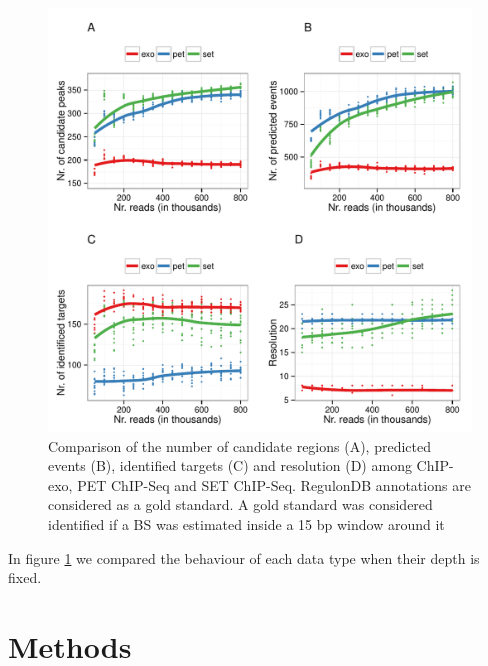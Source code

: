 \documentclass{bmcart}\usepackage[]{graphicx}\usepackage[]{color}
\begin{document}
\begin{figure}[h!]
  \centering
  \includegraphics[width = .8\textwidth]{../figs/for_paper/Sig70_aerobic_saturation.pdf}
  \caption{Comparison of the number of candidate regions (A),
    predicted events (B), identified targets (C) and resolution (D)
    among ChIP-exo, PET ChIP-Seq and SET ChIP-Seq. RegulonDB
    annotations are considered as a gold standard. A gold standard was
    considered identified if a BS was estimated inside a 15
    bp window around it}
  \label{fig:design}
\end{figure}

In figure \ref{fig:design} we compared the behaviour of each data type
when their depth is fixed. 


\newpage


\section*{Methods}
\label{sec:methods}







\nocite{exo_gb}
\end{document}
